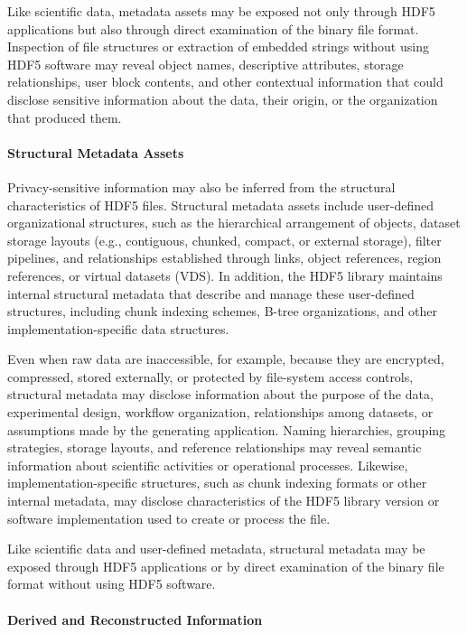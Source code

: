 \documentclass[../main.tex]{subfiles}
\begin{document}
Like scientific data, metadata assets may be exposed not only through HDF5 applications but 
also through direct examination of the binary file format. Inspection of file structures or 
extraction of embedded strings without using HDF5 software may reveal object names, 
descriptive attributes, storage relationships, user block contents, and other contextual 
information that could disclose sensitive information about the data, their origin, 
or the organization that produced them.

\paragraph{Structural Metadata Assets}

Privacy-sensitive information may also be inferred from the structural characteristics of HDF5 files. 
Structural metadata assets include user-defined organizational structures, such as 
the hierarchical arrangement of objects, dataset storage layouts (e.g., contiguous, chunked, 
compact, or external storage), filter pipelines, and relationships established through links, 
object references, region references, or virtual datasets (VDS). In addition, the HDF5 library 
maintains internal structural metadata that describe and manage these user-defined structures, 
including chunk indexing schemes, B-tree organizations, and other implementation-specific data structures.

Even when raw data are inaccessible, for example, because they are encrypted, compressed, 
stored externally, or protected by file-system access controls, structural metadata may 
disclose information about the purpose of the data, experimental design, workflow organization, 
relationships among datasets, or assumptions made by the generating application. 
Naming hierarchies, grouping strategies, storage layouts, and reference relationships may reveal 
semantic information about scientific activities or operational processes. Likewise, 
implementation-specific structures, such as chunk indexing formats or other internal metadata, 
may disclose characteristics of the HDF5 library version or software implementation 
used to create or process the file.

Like scientific data and user-defined metadata, structural metadata may be exposed through 
HDF5 applications or by direct examination of the binary file format without using HDF5 software.


\paragraph{Derived and Reconstructed Information}
\end{document}
